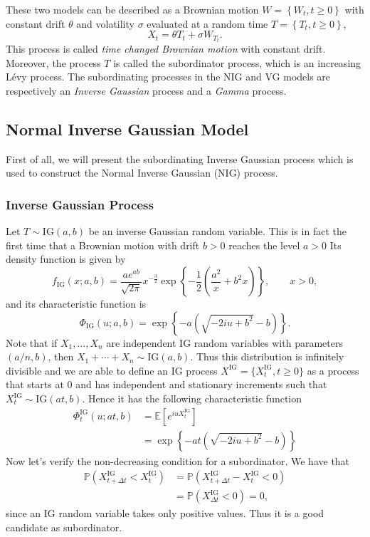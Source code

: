 These two models can be described as a Brownian motion $W=\left\{W_t,t\geq0\right\}$ with constant drift $\theta$ and volatility $\sigma$ evaluated at a random time $T=\left\{T_t,t\geq0\right\}$,
$$X_t = \theta T_t + \sigma W_{T_t}.$$
This process is called \textit{time changed Brownian motion} with constant drift. Moreover, the process $T$ is called the subordinator process, which is an increasing L\'evy process. The subordinating processes in the NIG and VG models are respectively an \textit{Inverse Gaussian} process and a \textit{Gamma} process.

\subsection{Normal Inverse Gaussian Model}
First of all, we will present the subordinating Inverse Gaussian process which is used to construct the Normal Inverse Gaussian (NIG) process.

\subsubsection*{Inverse Gaussian Process}
Let $T \sim \text{IG}(a,b)$ be an inverse Gaussian random variable. This is in fact the first time that a Brownian motion with drift $b>0$ reaches the level $a>0$
Its density function is given by
$$ f_\text{IG} (x;a,b) = \frac{a e^{ab}}{\sqrt{2\pi}}x^{-\frac{3}{2}}\exp\left\{-\frac{1}{2}\left(\frac{a^2}{x}+b^2x\right)\right\},\qquad x>0,$$
and its characteristic function is
$$\Phi_\text{IG}(u;a,b) = \exp\left\{-a\left(\sqrt{-2iu+b^2}-b\right)\right\}.$$
Note that if $X_1,\ldots,X_n$ are independent IG random variables with parameters $(a/n,b)$, then $X_1+\cdots+X_n \sim \text{IG}(a,b)$. Thus this distribution is infinitely divisible and we are able to define an IG process $X^\text{IG}=\{X^\text{IG}_t,t\geq0\}$ as a process that starts at $0$ and has independent and stationary increments such that $X_t^\text{IG}\sim\text{IG}(at,b)$. Hence it has the following characteristic function
\begin{align*}
\Phi_t^\text{IG}(u;at,b) &= \mathbb{E}\left[e^{iuX_t^\text{IG}}\right]\\
&=\exp\left\{-at\left(\sqrt{-2iu+b^2}-b\right)\right\}
\end{align*}
Now let's verify the non-decreasing condition for a subordinator. We have that
\begin{align*}
\mathbb{P}\left(X^\text{IG}_{t+\Delta t} < X^\text{IG}_t\right) &= \mathbb{P}\left(X^\text{IG}_{t+\Delta t}-X^\text{IG}_t < 0\right)\\
&=\mathbb{P}\left(X^\text{IG}_{\Delta t}<0\right) = 0,
\end{align*}
since an IG random variable takes only positive values. Thus it is a good candidate as subordinator.

